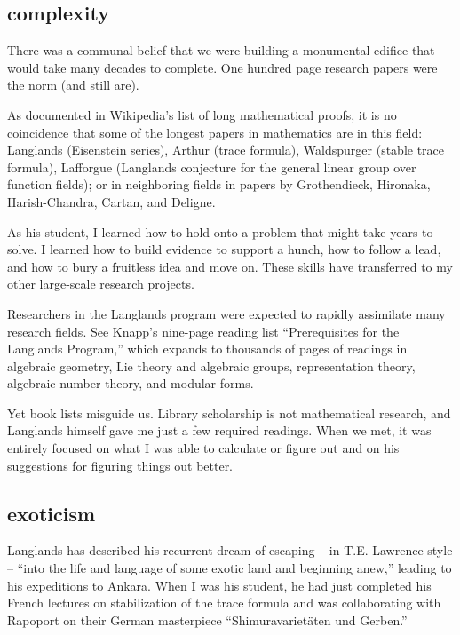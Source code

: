 \subsection{complexity}

There was a communal belief that we were building a monumental
edifice that would take many decades to complete.  One hundred page
research papers were the norm (and still are).

As documented in Wikipedia's list of long mathematical proofs, it is
no coincidence that some of the longest papers in mathematics are in
this field: Langlands (Eisenstein series), Arthur (trace formula),
Waldspurger (stable trace formula), Lafforgue (Langlands conjecture
for the general linear group over function fields); or in neighboring
fields in papers by Grothendieck, Hironaka, Harish-Chandra, Cartan, and Deligne.

As his student, I learned how to hold onto a problem that might take
years to solve.  I learned how to build evidence to support a hunch,
how to follow a lead, and how to bury a fruitless idea and move on.
These skills have transferred to my other large-scale research projects.


Researchers in the Langlands program were expected to rapidly
assimilate many research fields.  See Knapp's nine-page reading list
``Prerequisites for the Langlands Program,'' which expands to
thousands of pages of readings in algebraic geometry, Lie theory and
algebraic groups, representation theory, algebraic number theory, and
modular forms.

Yet book lists misguide us.  Library scholarship is not mathematical
research, and Langlands himself gave me just a few required
readings. When we met, it was entirely focused on what I was able to
calculate or figure out and on his suggestions for figuring things out
better.

\subsection{exoticism}

Langlands has described his recurrent dream of escaping -- in
T.E. Lawrence style -- ``into the life and language of some exotic
land and beginning anew,''
leading to his expeditions to Ankara.
When I was his student, he had just completed his
French lectures on stabilization of the trace formula and was
collaborating with Rapoport on their German masterpiece
``Shimuravariet\"aten und Gerben.''

